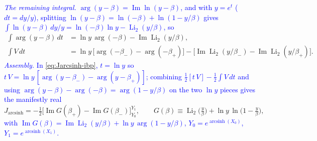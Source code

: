 \documentclass[11pt]{article}
\numberwithin{equation}{section}
\newcommand{\half}{\tfrac{1}{2}}
\DeclareMathOperator{\arcsinh}{arcsinh}
\newcommand{\cam}[1]{\textcolor{blue}{#1}}
\begin{document}
\cam{\emph{The remaining integral.} $\arg(y-\beta)=\operatorname{Im}\ln(y-\beta)$, and with $y=e^t$
($dt=dy/y$), splitting $\ln(y-\beta)=\ln(-\beta)+\ln(1-y/\beta)$ gives $\int\ln(y-\beta)\,dy/y
=\ln(-\beta)\ln y-\operatorname{Li}_2(y/\beta)$, so}
\begin{equation}\label{eq:intarg}
\begin{aligned}
  \int\arg(y-\beta)\,dt&=\ln y\,\arg(-\beta)-\operatorname{Im}\operatorname{Li}_2(y/\beta),\\
  \int V\,dt&=\ln y\,\big[\arg(-\beta_-)-\arg(-\beta_+)\big]
  -\big[\operatorname{Im}\operatorname{Li}_2(y/\beta_-)-\operatorname{Im}\operatorname{Li}_2(y/\beta_+)\big].
\end{aligned}
\end{equation}
\cam{\emph{Assembly.} In \eqref{eq:Jarcsinh-ibp}, $t=\ln y$ so $t\,V=\ln y\,[\arg(y-\beta_-)
-\arg(y-\beta_+)]$; combining $\half[t\,V]-\half\int V\,dt$ and using $\arg(y-\beta)-\arg(-\beta)
=\arg(1-y/\beta)$ on the two $\ln y$ pieces gives the manifestly real}
\begin{equation}\label{eq:Jarcsinh-real}
  J_{\arcsinh}=-\half\big[\operatorname{Im}G(\beta_+)-\operatorname{Im}G(\beta_-)\big]_{Y_0}^{Y_1},\qquad
  G(\beta)\equiv\operatorname{Li}_2\!\big(\tfrac{y}{\beta}\big)+\ln y\,\ln\!\big(1-\tfrac{y}{\beta}\big),
\end{equation}
\cam{with $\operatorname{Im}G(\beta)=\operatorname{Im}\operatorname{Li}_2(y/\beta)+\ln y\,\arg(1-y/\beta)$,
$Y_0=e^{\arcsinh(X_0)}$, $Y_1=e^{\arcsinh(X_1)}$.}
\end{document}
